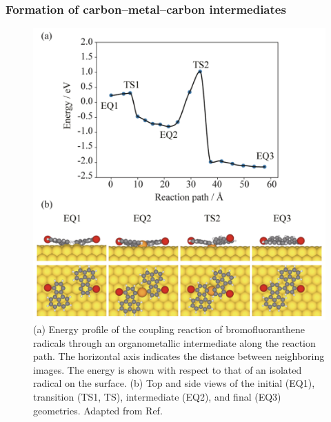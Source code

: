 \documentclass[%
 reprint,
 amsmath,amssymb,
 aps,
prb,
floatfix,
]{revtex4-2}
\begin{document}
\ifdefined\INTERNAL

\subsubsection{Formation of carbon--metal--carbon intermediates} \label{sec:dimerized-adatom}

\begin{figure}[tb]
\centering
\includegraphics[width=0.75\columnwidth]{Fig/adatominformation.png}
\caption{(a) Energy profile of the coupling reaction of bromofluoranthene radicals through an organometallic intermediate along the reaction path. The horizontal axis indicates the distance between neighboring images. The energy is shown with respect to that of an isolated radical on the surface. (b) Top and side views of the initial (EQ1), transition (TS1, TS), intermediate (EQ2), and final (EQ3) geometries. Adapted from Ref.~\cite{jpcc2018}}
\label{fig:high-lift}
\end{figure}
\end{document}
